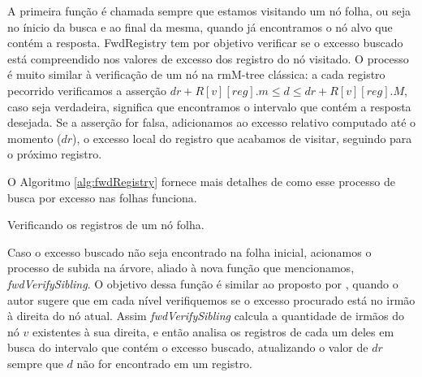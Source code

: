 A primeira função é chamada sempre que estamos visitando um nó folha, ou seja no ínicio da busca e ao final da mesma, quando já encontramos o nó alvo que contém a resposta.  FwdRegistry tem por objetivo verificar se o excesso buscado está compreendido nos valores de excesso dos registro do nó visitado. O processo é muito similar à verificação de um nó na rmM-tree clássica: a cada registro pecorrido verificamos a asserção $dr + R[v][reg].m \leq d \leq dr + R[v][reg].M$, caso seja verdadeira, significa que encontramos o intervalo que contém a resposta desejada. Se a asserção for falsa, adicionamos ao excesso relativo computado até o momento ($dr$), o excesso local do registro que acabamos de visitar, seguindo para o próximo registro.  

O Algoritmo \ref{alg:fwdRegistry} fornece mais detalhes de como esse processo de busca por excesso nas folhas funciona.

\begin{algorithm}[htp]

    \caption{Verificando os registros de um nó folha.}
    \label{alg:fwdRegistry}
    \end{algorithm}
    

Caso o excesso buscado não seja encontrado na folha inicial, acionamos o processo de subida na árvore, aliado à nova função que mencionamos, \textit{fwdVerifySibling}. O objetivo dessa função é similar ao proposto por \citet{book-compact-data-structures}, quando o autor sugere que em cada nível verifiquemos se o excesso procurado está no irmão à direita do nó atual. Assim \textit{fwdVerifySibling} calcula a quantidade de irmãos do nó $v$ existentes à sua direita, e então analisa os registros de cada um deles em busca do intervalo que contém o excesso buscado, atualizando o valor de $dr$ sempre que $d$ não for encontrado em um registro.

